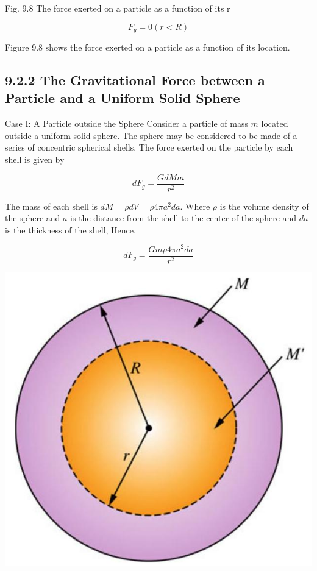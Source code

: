 \documentclass[10pt]{article}
\begin{document}
Fig. 9.8 The force exerted on a particle as a function of its r

$$
F_{g}=0(r<R)
$$

Figure 9.8 shows the force exerted on a particle as a function of its location.

\subsection*{9.2.2 The Gravitational Force between a Particle and a Uniform Solid Sphere}
Case I: A Particle outside the Sphere Consider a particle of mass $m$ located outside a uniform solid sphere. The sphere may be considered to be made of a series of concentric spherical shells. The force exerted on the particle by each shell is given by

$$
d F_{g}=\frac{G d M m}{r^{2}}
$$

The mass of each shell is $d M=\rho d V=\rho 4 \pi a^{2} d a$. Where $\rho$ is the volume density of the sphere and $a$ is the distance from the shell to the center of the sphere and $d a$ is the thickness of the shell, Hence,

$$
d F_{g}=\frac{G m \rho 4 \pi a^{2} d a}{r^{2}}
$$

\begin{center}
\includegraphics[max width=\textwidth]{2024_09_13_db1f357d2aad0a03eb2eg-148}
\end{center}
\end{document}
